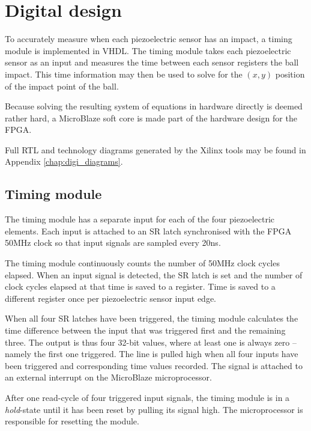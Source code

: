 \section{Digital design}
\label{cha:digidesign}
%
To accurately measure when each piezoelectric sensor has an impact, %
a timing module is implemented in VHDL.
The timing module takes each piezoelectric sensor as an input and measures the time between each sensor registers the ball impact.
This time information may then be used to solve for the $(x,y)$ position of the impact point of the ball.

Because solving the resulting system of equations in hardware directly is deemed rather hard, \cite{hardGauss}
 a MicroBlaze soft core is made part of the hardware design for the FPGA.

 Full RTL and technology diagrams generated by the Xilinx tools may be found in Appendix \ref{chap:digi_diagrams}.

\subsection{Timing module}
\label{sec:timing_module}
The timing module has a separate input for each of the four piezoelectric elements.
Each input is attached to an SR latch synchronised with the FPGA 50\si{MHz} clock so that input signals are sampled every 20\si{ns}.

%     

The timing module continuously counts the number of 50\si{MHz} clock cycles elapsed.
When an input signal is detected, the SR latch is set and the number of clock cycles elapsed at that time is saved to a register.
Time is saved to a different register once per piezoelectric sensor input edge.

When all four SR latches have been triggered, the timing module calculates the time difference between the input that was triggered first and the remaining three.
The output is thus four 32-bit values, where at least one is always zero -- namely the first one triggered.
The line  is pulled high when all four inputs have been triggered and corresponding time values recorded.
The  signal is attached to an external interrupt on the MicroBlaze microprocessor.

After one read-cycle of four triggered input signals, the timing module is in a \emph{hold}-state until it has been reset by pulling its  signal high.
The microprocessor is responsible for resetting the module.
